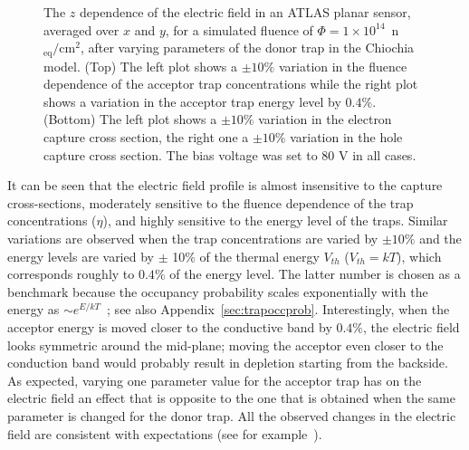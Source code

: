 \begin{figure}[htpb!]
\caption{The $z$ dependence of the electric field in an ATLAS planar sensor, averaged over $x$ and $y$, for a simulated
  fluence of $\Phi=1\times10^{14}$~n$_\text{eq}/\text{cm}^{2}$, after varying parameters of the donor trap in the Chiochia model. (Top) The left plot shows a $\pm 10\%$ variation in the fluence dependence of the acceptor trap concentrations while the right plot shows a variation in the acceptor trap energy level by $0.4\%$. 
  (Bottom) The left plot shows a $\pm 10\%$ variation in the electron capture cross section, the right one a $\pm 10\%$ variation in the hole capture cross section.
The bias voltage was set to $80$ V in all cases.}
\label{fig:don_electricfieldvariations}
\end{figure}

It can be seen that the electric field profile is almost insensitive to the capture cross-sections, moderately sensitive to the fluence dependence of the trap concentrations ($\eta$), and highly sensitive to the energy level of the traps. 
Similar variations are observed when the trap concentrations are varied by $\pm10\%$ and the energy levels are varied by $\pm$ 10\% of the thermal energy $V_{th}$ ($V_{th}=kT$), which corresponds roughly to $0.4\%$ of the energy level.  The latter number is chosen as a benchmark because the occupancy probability scales exponentially with the energy as $\sim e^{E/kT}$~\cite{LUTZ1996}; see also Appendix~\ref{sec:trapoccprob}. 
Interestingly, when the acceptor energy is moved closer to the conductive band by $0.4\%$, the electric field looks 
 symmetric around the mid-plane; moving the acceptor even closer to the conduction band would probably result in depletion 
 starting from the backside.
As expected, varying one parameter value for the acceptor trap has on the electric field an effect that is opposite 
to the one that is obtained when the same parameter is changed for the donor trap. 
All the observed changes in the electric field are consistent with expectations (see for example~\cite{LUTZ1996}).




